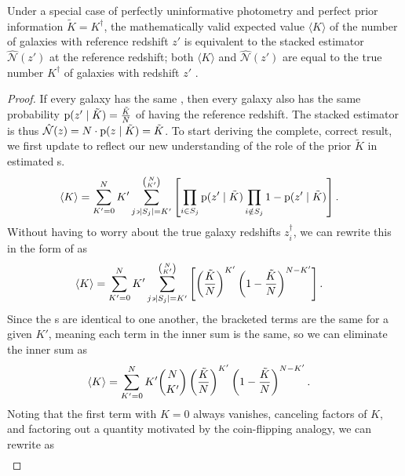 \begin{theorem}
	\label{thm:uninformative}
	Under a special case of perfectly uninformative photometry and perfect prior information ${\tilde{K} = K^{\dagger}}$, the mathematically valid expected value $\langle K \rangle$ of the number of galaxies with reference redshift $z'$ is equivalent to the stacked estimator $\hat{\mathcal{N}}(z')$ at the reference redshift; 
	both $\langle K \rangle$ and $\hat{\mathcal{N}}(z')$ are equal to the true number $K^{\dagger}$ of galaxies with redshift $z'$ .
\end{theorem}
\begin{proof}
	If every galaxy has the same \pzpdf, then every galaxy also has the same probability ${\mathrm{p}(z' \mid \tilde{K}) = \frac{\tilde{K}}{N}}$ of having the reference redshift.
	The stacked estimator is thus ${\hat{\mathcal{N}}(z) = N \cdot \mathrm{p}(z \mid \tilde{K}) = \tilde{K}}$.
	To start deriving the complete, correct result, we first update  to reflect our new understanding of the role of the prior $\tilde{K}$ in estimated \pzpdf s.
	\begin{align}
	\eqlabel{eqn:proofwithprior1}
	    \langle K \rangle &= \sum_{K' = 0}^{N} K' \sum_{j \backepsilon |S_{j}|=K'}^{\binom{N}{K'}} \left[ \prod_{i \in S_{j}} \pr{z' \gvn \tilde{K}} \prod_{i \notin S_{j}} 1 - \pr{z' \gvn \tilde{K}} \right] .
	\end{align}
	Without having to worry about the true galaxy redshifts $z^{\dagger}_{i}$, we can rewrite this in the form of  as
	\begin{align}
	\eqlabel{eqn:proofwithprior2}
	    \langle K \rangle &= \sum_{K' = 0}^{N} K' \sum_{j \backepsilon |S_{j}| = K'}^{\binom{N}{K'}} \left[ \left(\frac{\tilde{K}}{N}\right)^{K'} \left(1 - \frac{\tilde{K}}{N}\right)^{N - K'} \right] .
	\end{align}
	Since the \pzpdf s are identical to one another, the bracketed terms are the same for a given $K'$, meaning each term in the inner sum is the same, so we can eliminate the inner sum as 
	\begin{align}
	\eqlabel{eqn:proofwithprior3}
	    \langle K \rangle &= \sum_{K' = 0}^{N} K' \binom{N}{K'} \left(\frac{\tilde{K}}{N}\right)^{K'} \left(1 - \frac{\tilde{K}}{N}\right)^{N - K'} .
	\end{align}
	Noting that the first term with $K = 0$ always vanishes, canceling factors of $K$, and factoring out a quantity motivated by the coin-flipping analogy, we can rewrite  as
	\begin{align}

\end{align}
\end{proof}
